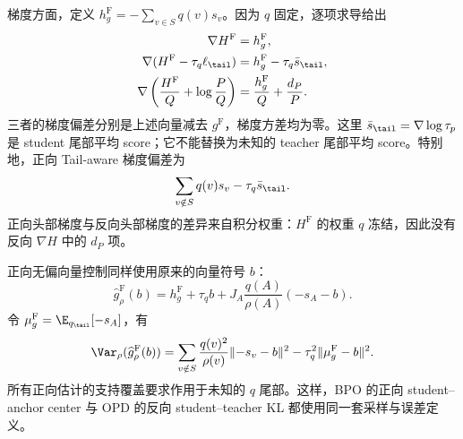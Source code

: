 梯度方面，定义 $h_g^{\mathrm F}=-\sum_{v\in S}q(v)s_v$。因为 $q$ 固定，逐项求导给出
\begin{align*}
 \nabla H^{\mathrm F}&=h_g^{\mathrm F},\\
 \nabla(H^{\mathrm F}-\tau_q\ell_{\tail})
 &=h_g^{\mathrm F}-\tau_q\bar s_{\tail},\\
 \nabla\left(\frac{H^{\mathrm F}}{Q}+\log\frac P Q\right)
 &=\frac{h_g^{\mathrm F}}{Q}+\frac{d_P}{P}.
\end{align*}
三者的梯度偏差分别是上述向量减去 $g^{\mathrm F}$，梯度方差均为零。这里 $\bar s_{\tail}=\nabla\log\tau_p$ 是 student 尾部平均 score；它不能替换为未知的 teacher 尾部平均 score。特别地，正向 Tail-aware 梯度偏差为
\[
 \sum_{v\notin S}q(v)s_v-\tau_q\bar s_{\tail}.
\]
正向头部梯度与反向头部梯度的差异来自积分权重：$H^{\mathrm F}$ 的权重 $q$ 冻结，因此没有反向 $\nabla H$ 中的 $d_P$ 项。

正向无偏向量控制同样使用原来的向量符号 $b$：
\[
 \widehat g^{\mathrm F}_\rho(b)
 =h_g^{\mathrm F}+\tau_qb
   +J_A\frac{q(A)}{\rho(A)}(-s_A-b).
\]
令 $\mu_g^{\mathrm F}=\E_{q_{\tail}}[-s_A]$，有
\[
 \Var_\rho(\widehat g^{\mathrm F}_\rho(b))
 =\sum_{v\notin S}\frac{q(v)^2}{\rho(v)}\lVert-s_v-b\rVert^2
  -\tau_q^2\lVert\mu_g^{\mathrm F}-b\rVert^2.
\]
所有正向估计的支持覆盖要求作用于未知的 $q$ 尾部。这样，BPO 的正向 student--anchor center 与 OPD 的反向 student--teacher KL 都使用同一套采样与误差定义。
